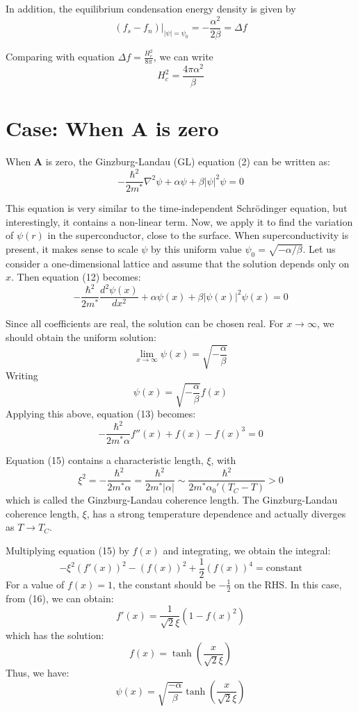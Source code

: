 \documentclass{article}
\begin{document}
In addition, the equilibrium condensation energy density is given by
\[
(f_s - f_n)\bigg|_{|\psi| = \psi_0} = - \frac{\alpha^2}{2\beta} = \Delta f \tag{40}
\]

Comparing with equation $\Delta f = \frac{H_c^2}{8\pi}$, we can write
\[
H_c^2 = \frac{4 \pi \alpha^2}{\beta} \tag{41}
\]

\section{Case: When $\mathbf{A}$ is zero}

When $\mathbf{A}$ is zero, the Ginzburg-Landau (GL) equation (2) can be written as:
\[
-\frac{\hbar^2}{2m^*} \nabla^2 \psi + \alpha \psi + \beta |\psi|^2 \psi = 0 \tag{12}
\]

This equation is very similar to the time-independent Schrödinger equation, but interestingly, it contains a non-linear term. Now, we apply it to find the variation of $\psi(r)$ in the superconductor, close to the surface. When superconductivity is present, it makes sense to scale $\psi$ by this uniform value $\psi_0 = \sqrt{-\alpha/\beta}$. Let us consider a one-dimensional lattice and assume that the solution depends only on $x$. Then equation (12) becomes:
\[
-\frac{\hbar^2}{2m^*} \frac{d^2 \psi(x)}{dx^2} + \alpha \psi(x) + \beta |\psi(x)|^2 \psi(x) = 0 \tag{13}
\]

Since all coefficients are real, the solution can be chosen real. For $x \to \infty$, we should obtain the uniform solution:
\[
\lim_{x \to \infty} \psi(x) = \sqrt{-\frac{\alpha}{\beta}}
\]
Writing
\[
\psi(x) = \sqrt{-\frac{\alpha}{\beta}} f(x) \tag{14}
\]
Applying this above, equation (13) becomes:
\[
-\frac{\hbar^2}{2m^* \alpha} f''(x) + f(x) - f(x)^3 = 0 \tag{15}
\]

Equation (15) contains a characteristic length, $\xi$, with
\[
\xi^2 = -\frac{\hbar^2}{2m^*\alpha} = \frac{\hbar^2}{2m^* |\alpha|} \sim \frac{\hbar^2}{2m^* \alpha_0' (T_C - T)} > 0
\]
which is called the Ginzburg-Landau coherence length. The Ginzburg-Landau coherence length, $\xi$, has a strong temperature dependence and actually diverges as $T \to T_C$.

Multiplying equation (15) by $f(x)$ and integrating, we obtain the integral:
\[
-\xi^2 \left(f'(x)\right)^2 - \left(f(x)\right)^2 + \frac{1}{2} \left(f(x)\right)^4 = \text{constant} \tag{16}
\]
For a value of $f(x) = 1$, the constant should be $-\frac{1}{2}$ on the RHS. In this case, from (16), we can obtain:
\[
f'(x) = \frac{1}{\sqrt{2}\xi} \left(1 - f(x)^2\right)
\]
which has the solution:
\[
f(x) = \tanh\left(\frac{x}{\sqrt{2}\xi}\right) \tag{17}
\]
Thus, we have:
\[
\psi(x) = \sqrt{\frac{-\alpha}{\beta}} \tanh\left(\frac{x}{\sqrt{2}\xi}\right)
\]
\end{document}
